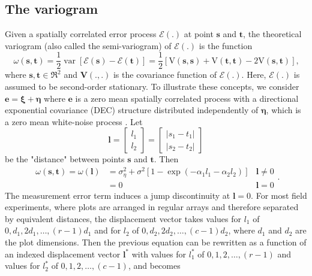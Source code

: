 \subsection{The variogram}
Given a spatially correlated error process $\mathcal{E}(.)$ at point $\mathbf{s}$ and $\mathbf{t}$, the theoretical variogram (also called the semi-variogram) of $\mathcal{E}(.)$ is the function
\begin{equation}
    \omega(\mathbf{s}, \mathbf{t})=\frac{1}{2} \operatorname{var}[\mathcal{E}(\mathbf{s})-\mathcal{E}(\mathbf{t})]=\frac{1}{2}[\mathrm{V}(\mathbf{s}, \mathbf{s})+\mathrm{V}(\mathbf{t}, \mathbf{t})-2 \mathrm{V}(\mathbf{s}, \mathbf{t})]
    \text{,}
\end{equation}
where $\mathbf{s,t} \in \Re^{2}$ and $\mathbf{V}(.,.)$ is the covariance function of $\mathcal{E}(.)$. Here, $\mathcal{E}(.)$ is assumed to be second-order stationary.
To illustrate these concepts, we consider $\mathbf{e}=\boldsymbol{\xi}+\boldsymbol{\eta}$ where $\mathbf{e}$ is a zero mean spatially correlated process with a directional exponential covariance (DEC) structure distributed independently of $\boldsymbol{\eta}$, which is a zero mean white-noise process \parencite{cressie1992statistics}. Let
\begin{equation*}
    \mathbf{l}=\left[ \begin{array}{l}{l_{1}} \\ {l_{2}}\end{array}\right]=\left[ \begin{array}{l}{\left|s_{1}-t_{1}\right|} \\ {\left|s_{2}-t_{2}\right|}\end{array}\right]
\end{equation*}
be the "distance" between points $\mathbf{s}$ and $\mathbf{t}$. Then
\begin{equation}
    \begin{array}{llr}
    {\omega(\mathbf{s}, \mathbf{t})=\omega(\mathbf{l})} & {=\sigma_{\eta}^{2}+\sigma^{2}\left[1-\exp \left(-\alpha_{1} l_{1}-\alpha_{2} l_{2}\right)\right]} & 
    {\mathbf{l} \neq 0} \\ 
    {} & 
    {=0} & 
    {\mathbf{l}=0}
    \end{array}
    \text{.}
\end{equation}
The measurement error term induces a jump discontinuity at $\mathbf{l}=0$. For most field experiments, where plots are arranged in regular arrays and therefore separated by equivalent distances, the displacement vector takes values for $l_1$ of $0,d_1,2d_1,\ldots,(r-1)d_1$ and for $l_2$ of $0,d_2,2d_2,\ldots,(c-1)d_2$, where $d_1$ and $d_2$ are the plot dimensions. Then the previous equation can be rewritten as a function of an indexed displacement vector $\mathbf{l}^{*}$ with values for $l_1^*$ of $0,1,2,\ldots,(r-1)$ and values for $l_2^*$ of $0,1,2,\ldots,(c-1)$, and becomes
